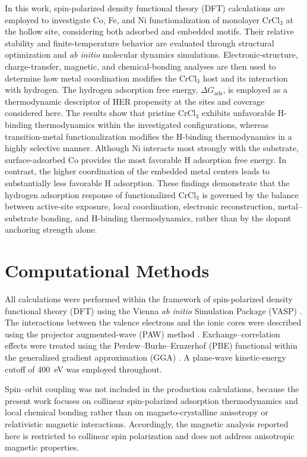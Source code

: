 \documentclass[journal=jacsat,manuscript=article]{achemso}
\begin{document}
In this work, spin-polarized density functional theory (DFT) calculations are employed to investigate Co, Fe, and Ni functionalization of monolayer CrCl$_3$ at the hollow site, considering both adsorbed and embedded motifs. Their relative stability and finite-temperature behavior are evaluated through structural optimization and \textit{ab initio} molecular dynamics simulations. Electronic-structure, charge-transfer, magnetic, and chemical-bonding analyses are then used to determine how metal coordination modifies the CrCl$_3$ host and its interaction with hydrogen. The hydrogen adsorption free energy, $\Delta G_{\mathrm{ads}}$, is employed as a thermodynamic descriptor of HER propensity at the sites and coverage considered here. The results show that pristine CrCl$_3$ exhibits unfavorable H-binding thermodynamics within the investigated configurations, whereas transition-metal functionalization modifies the H-binding thermodynamics in a highly selective manner. Although Ni interacts most strongly with the substrate, surface-adsorbed Co provides the most favorable H adsorption free energy. In contrast, the higher coordination of the embedded metal centers leads to substantially less favorable H adsorption. These findings demonstrate that the hydrogen adsorption response of functionalized CrCl$_3$ is governed by the balance between active-site exposure, local coordination, electronic reconstruction, metal--substrate bonding, and H-binding thermodynamics, rather than by the dopant anchoring strength alone.


\section{Computational Methods}

\noindent All calculations were performed within the framework of spin-polarized density functional theory (DFT) using the Vienna \textit{ab initio} Simulation Package (VASP) \cite{Kresse1996CMS,Kresse1996PRB}. The interactions between
the valence electrons and the ionic cores were described using the projector augmented-wave (PAW) method \cite{Blochl1994,Kresse1999}. Exchange--correlation effects were treated using the Perdew--Burke--Ernzerhof (PBE) functional within the generalized gradient approximation (GGA) \cite{PhysRevLett.77.3865}. A plane-wave kinetic-energy cutoff of 400~eV was employed throughout.

Spin--orbit coupling was not included in the production calculations, because the present work focuses on collinear spin-polarized adsorption thermodynamics and local chemical bonding rather than on magneto-crystalline anisotropy or relativistic magnetic interactions. Accordingly, the magnetic analysis reported here is restricted to collinear spin polarization and does not address anisotropic magnetic
properties.
\end{document}
